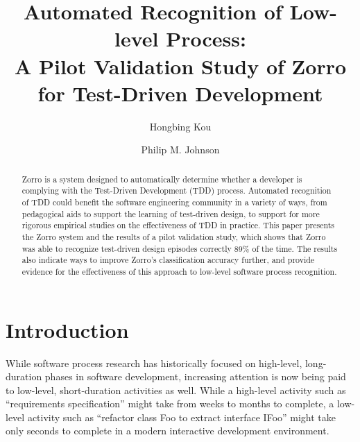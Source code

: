 \documentclass[runningheads]{llncs}
\begin{document}
\pagestyle{headings}
\mainmatter

\title{Automated Recognition of Low-level Process: \\
A Pilot Validation Study of Zorro for Test-Driven Development}


\author{
Hongbing Kou \and Philip M. Johnson}


\maketitle

\begin{abstract}  %
Zorro is a system designed to automatically determine whether a developer
is complying with the Test-Driven Development (TDD) process.  Automated
recognition of TDD could benefit the software engineering community in a
variety of ways, from pedagogical aids to support the learning of
test-driven design, to support for more rigorous empirical studies on the
effectiveness of TDD in practice.  This paper presents the Zorro system and
the results of a pilot validation study, which shows that Zorro was able to
recognize test-driven design episodes correctly 89\% of the time. The
results also indicate ways to improve Zorro's classification accuracy
further, and provide evidence for the effectiveness of this approach to
low-level software process recognition.
\end{abstract}

\section{Introduction}
\label{sec:intro}

While software process research has historically focused on high-level,
long-duration phases in software development, increasing attention is now
being paid to low-level, short-duration activities as well.  While a
high-level activity such as ``requirements specification'' might take from
weeks to months to complete, a low-level activity such as ``refactor class
Foo to extract interface IFoo'' might take only seconds to complete in a
modern interactive development environment.
\end{document}
